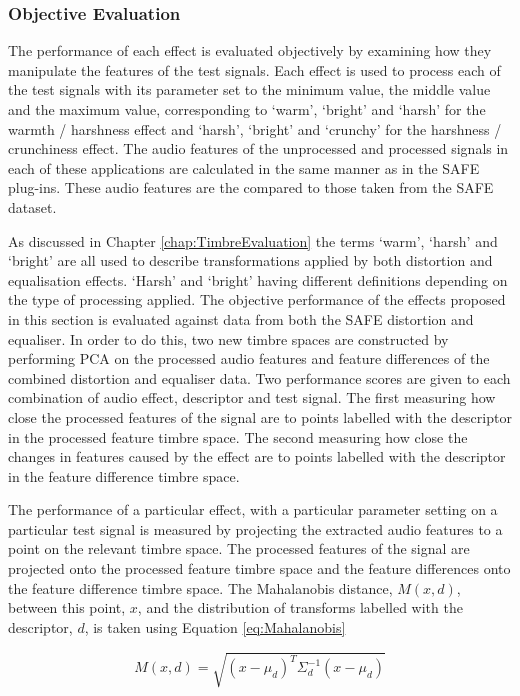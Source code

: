 		\subsubsection*{Objective Evaluation}
			The performance of each effect is evaluated objectively by examining how they manipulate the
			features of the test signals. Each effect is used to process each of the test signals with its
			parameter set to the minimum value, the middle value and the maximum value, corresponding to
			`warm', `bright' and `harsh' for the warmth / harshness effect and `harsh', `bright' and `crunchy'
			for the harshness / crunchiness effect. The audio features of the unprocessed and processed signals
			in each of these applications are calculated in the same manner as in the SAFE plug-ins. These
			audio features are the compared to those taken from the SAFE dataset.

			As discussed in Chapter \ref{chap:TimbreEvaluation} the terms `warm', `harsh' and `bright' are all
			used to describe transformations applied by both distortion and equalisation effects. `Harsh' and
			`bright' having different definitions depending on the type of processing applied. The objective
			performance of the effects proposed in this section is evaluated against data from both the SAFE
			distortion and equaliser. In order to do this, two new timbre spaces are constructed by performing
			PCA on the processed audio features and feature differences of the combined distortion and
			equaliser data. Two performance scores are given to each combination of audio effect, descriptor
			and test signal. The first measuring how close the processed features of the signal are to points
			labelled with the descriptor in the processed feature timbre space.  The second measuring how close
			the changes in features caused by the effect are to points labelled with the descriptor in the
			feature difference timbre space.

			The performance of a particular effect, with a particular parameter setting on a particular test
			signal is measured by projecting the extracted audio features to a point on the relevant timbre
			space. The processed features of the signal are projected onto the processed feature timbre space
			and the feature differences onto the feature difference timbre space. The Mahalanobis distance,
			$M(x, d)$, between this point, $x$, and the distribution of transforms labelled with the
			descriptor, $d$, is taken using Equation \ref{eq:Mahalanobis}
			
			\begin{equation}
				M(x, d) = \sqrt{(x - \mu_{d})^{T}\Sigma_{d}^{-1}(x - \mu_{d})}
				\label{eq:Mahalanobis}
			\end{equation}

